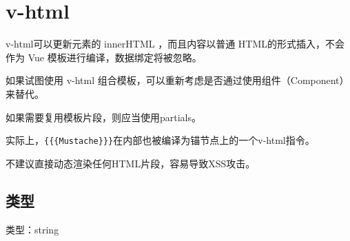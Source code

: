 \begin{lstlisting}[language=JavaScript]

\end{lstlisting}




\begin{lstlisting}[language=JavaScript]

\end{lstlisting}




\begin{lstlisting}[language=JavaScript]

\end{lstlisting}




\begin{lstlisting}[language=JavaScript]

\end{lstlisting}




\begin{lstlisting}[language=JavaScript]

\end{lstlisting}

\section{v-html}

v-html可以更新元素的 innerHTML ，而且内容以普通 HTML的形式插入，不会作为 Vue 模板进行编译，数据绑定将被忽略。

\begin{compactitem}
\item 如果试图使用 v-html 组合模板，可以重新考虑是否通过使用组件（Component）来替代。
\item 如果需要复用模板片段，则应当使用partials。
\end{compactitem}

实际上，\texttt{\{\{\{Mustache\}\}\}}在内部也被编译为锚节点上的一个v-html指令。

不建议直接动态渲染任何HTML片段，容易导致XSS攻击。

\subsection{类型}

\begin{compactitem}
\item 类型：string
\end{compactitem}

